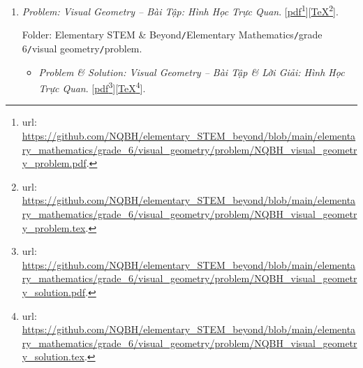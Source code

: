 \documentclass[12pt,twoside]{book}
\begin{document}
\begin{enumerate}
	Folder: {\sf Elementary STEM \& Beyond{\tt/}Elementary Mathematics{\tt/}grade 6{\tt/}integer{\tt/}problem}.
	\begin{itemize}
		\item {\it Problem \& Solution: Integers $\mathbb{Z}$ -- Bài Tập \& Lời Giải: Số Nguyên $\mathbb{Z}$}.
		
		Folder: {\sf Elementary STEM \& Beyond{\tt/}Elementary Mathematics{\tt/}grade 6{\tt/}integer{\tt/}solution}: [\href{https://github.com/NQBH/elementary_STEM_beyond/blob/main/elementary_mathematics/grade_6/integer/problem/NQBH_integer_solution.pdf}{pdf}\footnote{{\sc url}: \url{https://github.com/NQBH/elementary_STEM_beyond/blob/main/elementary_mathematics/grade_6/integer/problem/NQBH_integer_solution.pdf}.}][\href{https://github.com/NQBH/elementary_STEM_beyond/blob/main/elementary_mathematics/grade_6/integer/problem/NQBH_integer_solution.tex}{\TeX}\footnote{{\sc url}: \url{https://github.com/NQBH/elementary_STEM_beyond/blob/main/elementary_mathematics/grade_6/integer/problem/NQBH_integer_solution.tex}.}].
	\end{itemize}
	\item {\it Problem: Visual Geometry -- Bài Tập: Hình Học Trực Quan}. [\href{https://github.com/NQBH/elementary_STEM_beyond/blob/main/elementary_mathematics/grade_6/visual_geometry/problem/NQBH_visual_geometry_problem.pdf}{pdf}\footnote{{\sc url}: \url{https://github.com/NQBH/elementary_STEM_beyond/blob/main/elementary_mathematics/grade_6/visual_geometry/problem/NQBH_visual_geometry_problem.pdf}.}][\href{https://github.com/NQBH/elementary_STEM_beyond/blob/main/elementary_mathematics/grade_6/visual_geometry/problem/NQBH_visual_geometry_problem.tex}{\TeX}\footnote{{\sc url}: \url{https://github.com/NQBH/elementary_STEM_beyond/blob/main/elementary_mathematics/grade_6/visual_geometry/problem/NQBH_visual_geometry_problem.tex}.}].
	
	Folder: {\sf Elementary STEM \& Beyond{\tt/}Elementary Mathematics{\tt/}grade 6{\tt/}visual geometry{\tt/}problem}.
	\begin{itemize}
		\item {\it Problem \& Solution: Visual Geometry -- Bài Tập \& Lời Giải: Hình Học Trực Quan}. [\href{https://github.com/NQBH/elementary_STEM_beyond/blob/main/elementary_mathematics/grade_6/visual_geometry/problem/NQBH_visual_geometry_solution.pdf}{pdf}\footnote{{\sc url}: \url{https://github.com/NQBH/elementary_STEM_beyond/blob/main/elementary_mathematics/grade_6/visual_geometry/problem/NQBH_visual_geometry_solution.pdf}.}][\href{https://github.com/NQBH/elementary_STEM_beyond/blob/main/elementary_mathematics/grade_6/visual_geometry/problem/NQBH_visual_geometry_solution.tex}{\TeX}\footnote{{\sc url}: \url{https://github.com/NQBH/elementary_STEM_beyond/blob/main/elementary_mathematics/grade_6/visual_geometry/problem/NQBH_visual_geometry_solution.tex}.}].
		

\end{itemize}
\end{enumerate}
\end{document}
